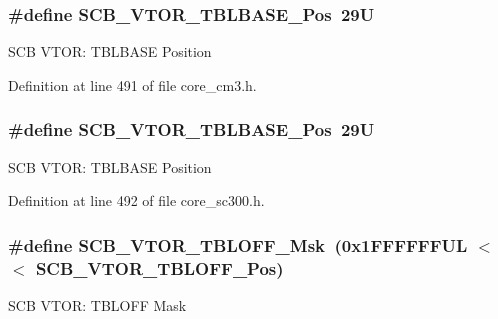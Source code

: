 \subsubsection[{\texorpdfstring{S\+C\+B\+\_\+\+V\+T\+O\+R\+\_\+\+T\+B\+L\+B\+A\+S\+E\+\_\+\+Pos}{SCB_VTOR_TBLBASE_Pos}}]{\setlength{\rightskip}{0pt plus 5cm}\#define S\+C\+B\+\_\+\+V\+T\+O\+R\+\_\+\+T\+B\+L\+B\+A\+S\+E\+\_\+\+Pos~29U}\hypertarget{group___c_m_s_i_s___s_c_b_gad9720a44320c053883d03b883b955751}{}\label{group___c_m_s_i_s___s_c_b_gad9720a44320c053883d03b883b955751}
S\+CB V\+T\+OR\+: T\+B\+L\+B\+A\+SE Position 

Definition at line 491 of file core\+\_\+cm3.\+h.

\subsubsection[{\texorpdfstring{S\+C\+B\+\_\+\+V\+T\+O\+R\+\_\+\+T\+B\+L\+B\+A\+S\+E\+\_\+\+Pos}{SCB_VTOR_TBLBASE_Pos}}]{\setlength{\rightskip}{0pt plus 5cm}\#define S\+C\+B\+\_\+\+V\+T\+O\+R\+\_\+\+T\+B\+L\+B\+A\+S\+E\+\_\+\+Pos~29U}\hypertarget{group___c_m_s_i_s___s_c_b_gad9720a44320c053883d03b883b955751}{}\label{group___c_m_s_i_s___s_c_b_gad9720a44320c053883d03b883b955751}
S\+CB V\+T\+OR\+: T\+B\+L\+B\+A\+SE Position 

Definition at line 492 of file core\+\_\+sc300.\+h.

\subsubsection[{\texorpdfstring{S\+C\+B\+\_\+\+V\+T\+O\+R\+\_\+\+T\+B\+L\+O\+F\+F\+\_\+\+Msk}{SCB_VTOR_TBLOFF_Msk}}]{\setlength{\rightskip}{0pt plus 5cm}\#define S\+C\+B\+\_\+\+V\+T\+O\+R\+\_\+\+T\+B\+L\+O\+F\+F\+\_\+\+Msk~(0x1\+F\+F\+F\+F\+F\+F\+U\+L $<$$<$ S\+C\+B\+\_\+\+V\+T\+O\+R\+\_\+\+T\+B\+L\+O\+F\+F\+\_\+\+Pos)}\hypertarget{group___c_m_s_i_s___s_c_b_ga75e395ed74042923e8c93edf50f0996c}{}\label{group___c_m_s_i_s___s_c_b_ga75e395ed74042923e8c93edf50f0996c}
S\+CB V\+T\+OR\+: T\+B\+L\+O\+FF Mask 

